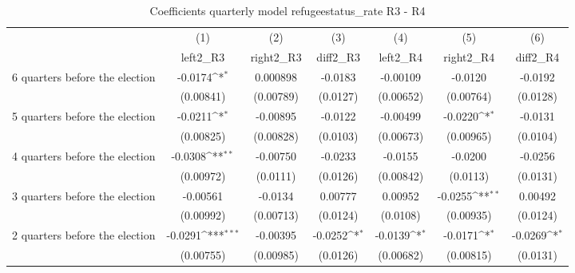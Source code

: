 \begin{table}[htbp]\centering
\def\sym#1{\ifmmode^{#1}\else\(^{#1}\)\fi}
\caption{Coefficients quarterly model refugeestatus\_rate R3 - R4}
\begin{tabular}{l*{6}{c}}
\hline\hline
                    &\multicolumn{1}{c}{(1)}&\multicolumn{1}{c}{(2)}&\multicolumn{1}{c}{(3)}&\multicolumn{1}{c}{(4)}&\multicolumn{1}{c}{(5)}&\multicolumn{1}{c}{(6)}\\
                    &\multicolumn{1}{c}{left2\_R3}&\multicolumn{1}{c}{right2\_R3}&\multicolumn{1}{c}{diff2\_R3}&\multicolumn{1}{c}{left2\_R4}&\multicolumn{1}{c}{right2\_R4}&\multicolumn{1}{c}{diff2\_R4}\\
\hline
 6 quarters before the election&     -0.0174\sym{*}  &    0.000898         &     -0.0183         &    -0.00109         &     -0.0120         &     -0.0192         \\
                    &   (0.00841)         &   (0.00789)         &    (0.0127)         &   (0.00652)         &   (0.00764)         &    (0.0128)         \\
[1em]
 5 quarters before the election&     -0.0211\sym{*}  &    -0.00895         &     -0.0122         &    -0.00499         &     -0.0220\sym{*}  &     -0.0131         \\
                    &   (0.00825)         &   (0.00828)         &    (0.0103)         &   (0.00673)         &   (0.00965)         &    (0.0104)         \\
[1em]
 4 quarters before the election&     -0.0308\sym{**} &    -0.00750         &     -0.0233         &     -0.0155         &     -0.0200         &     -0.0256         \\
                    &   (0.00972)         &    (0.0111)         &    (0.0126)         &   (0.00842)         &    (0.0113)         &    (0.0131)         \\
[1em]
 3 quarters before the election&    -0.00561         &     -0.0134         &     0.00777         &     0.00952         &     -0.0255\sym{**} &     0.00492         \\
                    &   (0.00992)         &   (0.00713)         &    (0.0124)         &    (0.0108)         &   (0.00935)         &    (0.0124)         \\
[1em]
 2 quarters before the election&     -0.0291\sym{***}&    -0.00395         &     -0.0252\sym{*}  &     -0.0139\sym{*}  &     -0.0171\sym{*}  &     -0.0269\sym{*}  \\
                    &   (0.00755)         &   (0.00985)         &    (0.0126)         &   (0.00682)         &   (0.00815)         &    (0.0131)         \\

\end{tabular}
\end{table}
